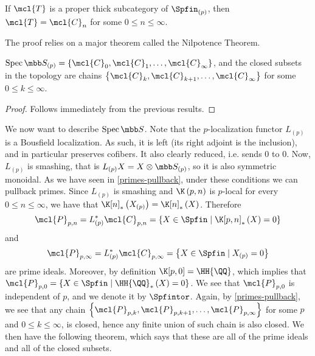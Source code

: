 \begin{theorem}\label{thick-subcategory-thm}
	If $\mcl{T}$ is a proper thick subcategory of $\Spfin_{\left(p\right)}$, then $\mcl{T} = \mcl{C}_n$ for some $0 \leq n \leq \infty$.
\end{theorem}

\begin{remark}
	The proof relies on a major theorem called the Nilpotence Theorem.
\end{remark}

\begin{corollary}
	$\spec \SS_{\left(p\right)} = \left\{ \mcl{C}_0, \mcl{C}_1, \dotsc, \mcl{C}_\infty \right\}$,
	and the closed subsets in the topology are chains
	$\left\{ \mcl{C}_k, \mcl{C}_{k+1}, \dotsc, \mcl{C}_\infty \right\}$
	for some $0 \leq k \leq \infty$.
\end{corollary}

\begin{proof}
	Follows immediately from the previous results.
\end{proof}

We now want to describe $\spec \SS$.
Note that the $p$-localization functor $L_{\left(p\right)}$ is a Bousfield localization.
As such, it is left (its right adjoint is the inclusion), and in particular preserves cofibers.
It also clearly reduced, i.e. sends $0$ to $0$.
Now, $L_{\left(p\right)}$ is smashing, that is $L_{\left(p\right)} X = X \otimes \SS_{\left(p\right)}$, so it is also symmetric monoidal.
As we have seen in \ref{primes-pullback}, under these conditions we can pullback primes.
Since $L_{\left(p\right)}$ is smashing and $\K\left(p,n\right)$ is $p$-local for every $0 \leq n \leq \infty$, we have that $\K[n]_*\left(X_{\left(p\right)}\right) = \K[n]_*\left(X\right)$.
Therefore
$$
\mcl{P}_{p, n}
= L_{\left(p\right)}^* \mcl{C}_{p, n}
= \left\{
	X \in \Spfin
	\mid
	\K[p,n]_*\left(X\right) = 0
\right\}
$$
and
$$
\mcl{P}_{p, \infty}
= L_{\left(p\right)}^* \mcl{C}_{p, \infty}
= \left\{
	X \in \Spfin
	\mid
	X_{\left(p\right)} = 0
\right\}
$$
are prime ideals.
Moreover, by definition $\K[p,0] = \HH{\QQ}$, which implies that
$
\mcl{P}_{p, 0}
= \left\{
	X \in \Spfin
	\mid
	{\HH{\QQ}}_*\left(X\right) = 0
\right\}
$.
We see that $\mcl{P}_{p, 0}$ is independent of $p$, and we denote it by $\Spfintor$.
Again, by \ref{primes-pullback}, we see that any chain $\left\{ \mcl{P}_{p, k}, \mcl{P}_{p, k+1}, \dotsc, \mcl{P}_{p, \infty} \right\}$ for some $p$ and $0 \leq k \leq \infty$, is closed, hence any finite union of such chain is also closed.
We then have the following theorem, which says that these are all of the prime ideals and all of the closed subsets.


